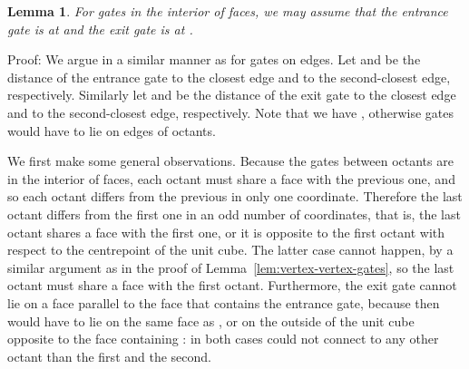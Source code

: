 \documentclass[11pt,a4paper]{article}
\newtheorem{lemma}{Lemma}
\newenvironment{proof}{Proof:}{\qed}
\def\squareforqed{\hbox{\rlap{}}}
\def\qed{\ifmmode\squareforqed\else{\unskip\nobreak\hfil
\penalty50\hskip1em\null\nobreak\hfil\squareforqed
\parfillskip=0pt\finalhyphendemerits=0\endgraf}\fi}
\begin{document}
\begin{lemma}\label{lem:face-face-gates}
For gates in the interior of faces, we may assume that the entrance gate is at  and the exit gate is at .
\end{lemma}
\begin{proof}
We argue in a similar manner as for gates on edges. Let  and  be the distance of the entrance gate to the closest edge and to the second-closest edge, respectively. Similarly let  and  be the distance of the exit gate to the closest edge and to the second-closest edge, respectively. Note that we have , otherwise gates would have to lie on edges of octants.

We first make some general observations. Because the gates between octants are in the interior of faces, each octant must share a face with the previous one, and so each octant differs from the previous in only one coordinate. Therefore the last octant differs from the first one in an odd number of coordinates, that is, the last octant shares a face with the first one, or it is opposite to the first octant with respect to the centrepoint of the unit cube. The latter case cannot happen, by a similar argument as in the proof of Lemma~\ref{lem:vertex-vertex-gates}, so the last octant must share a face with the first octant. Furthermore, the exit gate cannot lie on a face parallel to the face that contains the entrance gate, because then  would have to lie on the same face as , or on the outside of the unit cube opposite to the face containing : in both cases  could not connect to any other octant than the first and the second.


\end{proof}
\end{document}
